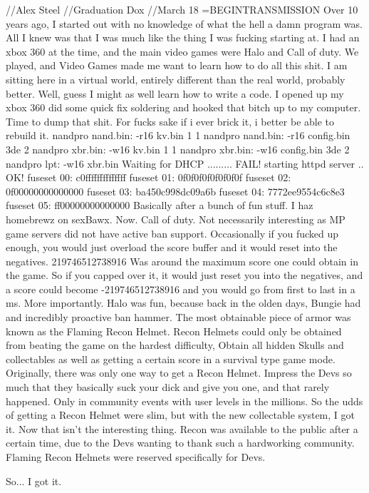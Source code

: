 //Alex Steel
//Graduation Dox
//March 18
=BEGINTRANSMISSION
Over 10 years ago, I started out with no knowledge of what the hell a damn program was.
All I knew was that I was much like the thing I was fucking starting at.
I had an xbox 360 at the time, and the main video games were Halo and Call of duty.
We played, and Video Games made me want to learn how to do all this shit.
I am sitting here in a virtual world, entirely different than the real world, probably better.
Well, guess I might as well learn how to write a code.
I opened up my xbox 360 did some quick fix soldering and hooked that bitch up to my computer.
Time to dump that shit. For fucks sake if i ever brick it, i better be able to rebuild it.
nandpro nand.bin: -r16 kv.bin 1 1
nandpro nand.bin: -r16 config.bin 3de 2
nandpro xbr.bin: -w16 kv.bin 1 1
nandpro xbr.bin: -w16 config.bin 3de 2
nandpro lpt: -w16 xbr.bin
Waiting for DHCP ......... FAIL!
starting httpd server .. OK!
fuseset 00: c0ffffffffffffff
fuseset 01: 0f0f0f0f0f0f0f0f
fuseset 02: 0f00000000000000
fuseset 03: ba450c998dc09a6b
fuseset 04: 7772ee9554c6c8e3
fuseset 05: ff00000000000000
Basically after a bunch of fun stuff. I haz homebrewz on sexBawx.
Now. Call of duty. Not necessarily interesting as MP game servers 
did not have active ban support. Occasionally if you fucked up enough, 
you would just overload the score buffer and it would reset into the negatives.
219746512738916 Was around the maximum score one could obtain in the game.
So if you capped over it, it would just reset you into the negatives, and a score
could become -219746512738916 and you would go from first to last in a ms.
More importantly. Halo was fun, because back in the olden days, Bungie had
and incredibly proactive ban hammer. The most obtainable piece of armor
was known as the Flaming Recon Helmet. Recon Helmets could only be obtained
from beating the game on the hardest difficulty, Obtain all hidden Skulls and collectables
as well as getting a certain score in a survival type game mode. Originally, there was only
one way to get a Recon Helmet. Impress the Devs so much that they basically suck your dick
and give you one, and that rarely happened. Only in community events with user levels in the millions.
So the udds of getting a Recon Helmet were slim, but with the new collectable system, I got it.
Now that isn't the interesting thing. Recon was available to the public after a certain time,
due to the Devs wanting to thank such a hardworking community. Flaming Recon Helmets were
reserved specifically for Devs. 

So... I got it.

